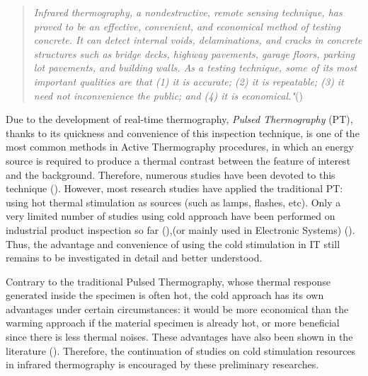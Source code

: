 \begin{quote}
	\textit{Infrared thermography, a nondestructive, remote sensing technique, has proved to be an effective, convenient, and economical method of testing concrete. It can detect internal voids, delaminations, and cracks in concrete structures such as bridge decks, highway pavements, garage floors, parking lot pavements, and building walls. As a testing technique, some of its most important qualities are that (1) it is accurate; (2) it is repeatable; (3) it need not inconvenience the public; and (4) it is economical."}(\citet{malhotra2004handbook})
\end{quote} 

Due to the development of real-time thermography, \textit{Pulsed Thermography} (PT), thanks to its quickness and convenience of this inspection technique, is one of the most common methods in Active Thermography procedures, in which an energy source is required to produce a thermal contrast between the feature of interest and the background.  Therefore, numerous studies have been devoted to this technique (\citet{Mayr2011active,Maldague1993Nondestructive,Maldague1994bInfra,Maldague2002intro,Maldague2004Double,2007-Ibarra-Castanedo,2011-ClementeIbarra-Castanedo,2007-ClementeIbarra-Castanedo,shoja2011inspection,duan2013quantitative,vahiddefect2014}). However, most research studies have applied the traditional PT: using hot thermal stimulation as sources (such as lamps, flashes, etc). Only a very limited number of studies using cold approach have been performed on industrial product inspection so far (\citet{Burleigh1989Thermographic, Maldague1993Nondestructive,Maldague1994bInfra,endohdynamical2012}),(or mainly used in Electronic Systems) (\citet{Swiatczak2008Evaluation, Swiatczak2010Frequency, 2012-LewisHom}). Thus, the advantage and convenience of using the cold stimulation in IT still remains to be investigated in detail and better understood.

Contrary to the traditional Pulsed Thermography, whose thermal response generated inside the specimen is often hot, the cold approach has its own advantages under certain circumstances: it would be more economical than the warming approach if the material specimen is already hot, or more beneficial since there is less thermal noises. These advantages have also been shown in the literature (\citet{Maldague1993Nondestructive,Maldague1994bInfra,Swiatczak2008Evaluation, endohdynamical2012}). Therefore, the continuation of studies on cold stimulation resources in infrared thermography is encouraged by these preliminary researches.

 
